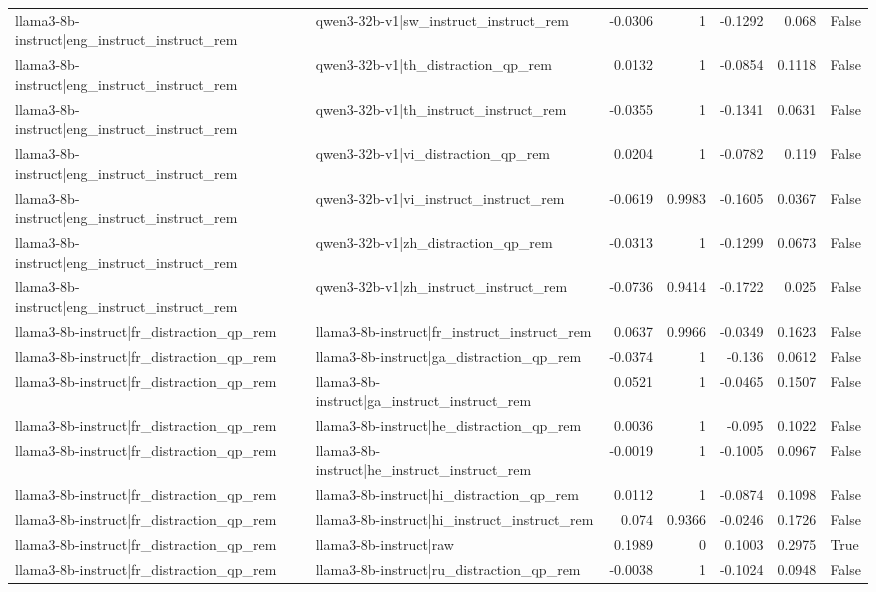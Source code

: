 \begin{table}
\begin{tabular}{l l r r r r l}
llama3-8b-instruct|eng_instruct_instruct_rem & qwen3-32b-v1|sw_instruct_instruct_rem & -0.0306 & 1 & -0.1292 & 0.068 & False \\
llama3-8b-instruct|eng_instruct_instruct_rem & qwen3-32b-v1|th_distraction_qp_rem & 0.0132 & 1 & -0.0854 & 0.1118 & False \\
llama3-8b-instruct|eng_instruct_instruct_rem & qwen3-32b-v1|th_instruct_instruct_rem & -0.0355 & 1 & -0.1341 & 0.0631 & False \\
llama3-8b-instruct|eng_instruct_instruct_rem & qwen3-32b-v1|vi_distraction_qp_rem & 0.0204 & 1 & -0.0782 & 0.119 & False \\
llama3-8b-instruct|eng_instruct_instruct_rem & qwen3-32b-v1|vi_instruct_instruct_rem & -0.0619 & 0.9983 & -0.1605 & 0.0367 & False \\
llama3-8b-instruct|eng_instruct_instruct_rem & qwen3-32b-v1|zh_distraction_qp_rem & -0.0313 & 1 & -0.1299 & 0.0673 & False \\
llama3-8b-instruct|eng_instruct_instruct_rem & qwen3-32b-v1|zh_instruct_instruct_rem & -0.0736 & 0.9414 & -0.1722 & 0.025 & False \\
llama3-8b-instruct|fr_distraction_qp_rem & llama3-8b-instruct|fr_instruct_instruct_rem & 0.0637 & 0.9966 & -0.0349 & 0.1623 & False \\
llama3-8b-instruct|fr_distraction_qp_rem & llama3-8b-instruct|ga_distraction_qp_rem & -0.0374 & 1 & -0.136 & 0.0612 & False \\
llama3-8b-instruct|fr_distraction_qp_rem & llama3-8b-instruct|ga_instruct_instruct_rem & 0.0521 & 1 & -0.0465 & 0.1507 & False \\
llama3-8b-instruct|fr_distraction_qp_rem & llama3-8b-instruct|he_distraction_qp_rem & 0.0036 & 1 & -0.095 & 0.1022 & False \\
llama3-8b-instruct|fr_distraction_qp_rem & llama3-8b-instruct|he_instruct_instruct_rem & -0.0019 & 1 & -0.1005 & 0.0967 & False \\
llama3-8b-instruct|fr_distraction_qp_rem & llama3-8b-instruct|hi_distraction_qp_rem & 0.0112 & 1 & -0.0874 & 0.1098 & False \\
llama3-8b-instruct|fr_distraction_qp_rem & llama3-8b-instruct|hi_instruct_instruct_rem & 0.074 & 0.9366 & -0.0246 & 0.1726 & False \\
llama3-8b-instruct|fr_distraction_qp_rem & llama3-8b-instruct|raw & 0.1989 & 0 & 0.1003 & 0.2975 & True \\
llama3-8b-instruct|fr_distraction_qp_rem & llama3-8b-instruct|ru_distraction_qp_rem & -0.0038 & 1 & -0.1024 & 0.0948 & False \\

\end{tabular}
\end{table}
